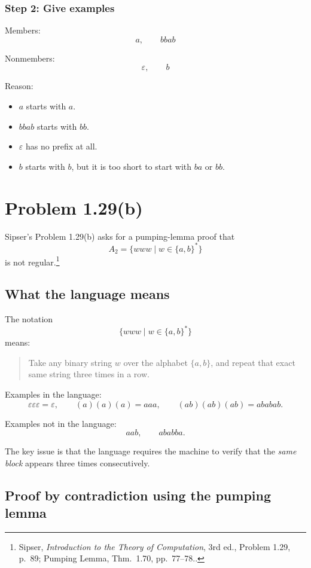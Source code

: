 \documentclass[12pt]{article}
\newcommand{\sipser}[1]{\footnote{Sipser, \emph{Introduction to the Theory of Computation}, 3rd ed., #1.}}
\begin{document}
\subsubsection*{Step 2: Give examples}

Members:
\[
a,\qquad bbab
\]

Nonmembers:
\[
\varepsilon,\qquad b
\]

Reason:
\begin{itemize}[itemsep=0.3em]
    \item \(a\) starts with \(a\).
    \item \(bbab\) starts with \(bb\).
    \item \(\varepsilon\) has no prefix at all.
    \item \(b\) starts with \(b\), but it is too short to start with \(ba\) or \(bb\).
\end{itemize}

\newpage
\section*{Problem 1.29(b)}

Sipser's Problem 1.29(b) asks for a pumping-lemma proof that
\[
A_2=\{www \mid w\in\{a,b\}^*\}
\]
is not regular.\sipser{Problem 1.29, p.~89; Pumping Lemma, Thm.~1.70, pp.~77--78.}

\subsection*{What the language means}

The notation
\[
\{www \mid w\in\{a,b\}^*\}
\]
means:
\begin{quote}
Take any binary string \(w\) over the alphabet \(\{a,b\}\), and repeat that exact same string three times in a row.
\end{quote}

Examples in the language:
\[
\varepsilon\varepsilon\varepsilon=\varepsilon,\qquad
(a)(a)(a)=aaa,\qquad
(ab)(ab)(ab)=ababab.
\]

Examples not in the language:
\[
aab,\qquad ababba.
\]

The key issue is that the language requires the machine to verify that the \emph{same block} appears three times consecutively.

\subsection*{Proof by contradiction using the pumping lemma}
\end{document}
